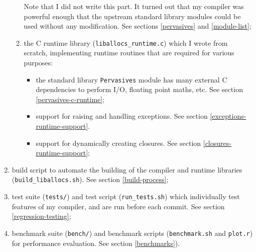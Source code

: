 \documentclass[12pt,a4paper,twoside,openright]{report}
\begin{document}
\begin{enumerate}
\begin{enumerate}
        Note that I did not write this part. It turned out that my compiler was powerful enough that the upstream
        standard library modules could be used without any modification. See
        sections \ref{pervasives} and \ref{module-list};
      \item the C runtime library (\lstinline!liballocs_runtime.c!) which I
          wrote from scratch, implementing runtime routines that are required
          for various purposes:
        \begin{itemize}
          \item the standard library \lstinline!Pervasives! module has many external C dependencies to perform I/O, floating point maths, etc. See section \ref{pervasives-c-runtime};
          \item support for raising and handling exceptions. See section \ref{exceptions-runtime-support}.
          \item support for dynamically creating closures. See section \ref{closures-runtime-support};
        \end{itemize}
    \end{enumerate}
  \item build script to automate the building of the compiler and runtime libraries (\lstinline!build_liballocs.sh!). See section \ref{build-process};
  \item test suite (\lstinline!tests/!) and test script (\lstinline!run_tests.sh!) which individually test features of my compiler, and are run before each commit. See section \ref{regression-testing};
  \item benchmark suite (\lstinline!bench/!) and benchmark scripts (\lstinline!benchmark.sh! and \lstinline!plot.r!) for performance evaluation. See section \ref{benchmarks}).
\end{enumerate}
\end{document}
